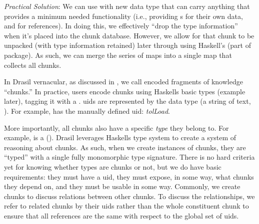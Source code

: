 \begin{writingdirectives}
      \item \textit{Practical Solution}: We can use \ExistentialQuantification{}
            with new data type that can carry anything that provides a minimum
            needed functionality (i.e., providing \UID{}s for their own data,
            and for references). In doing this, we effectively ``drop the type
            information'' when it's placed into the chunk database. However, we
            allow for that chunk to be unpacked (with type information retained)
            later through using Haskell's  (part of
             package). As such, we can merge the series of maps
            into a single map that collects all chunks.

\end{writingdirectives}

In Drasil vernacular, as discussed in , we call encoded
fragments of knowledge ``chunks.'' In practice, users encode chunks using
Haskells basic  types (example later), tagging it with a
. \acsp{uid} are represented by the \UID{} data type (a string of text,
). For example, 
has the manually defined \acs{uid}: \textit{tolLoad}.

More importantly, all chunks also have a specific \textit{type} they belong to.
For example,  is a \QuantityDict{}
(). Drasil leverages Haskells type system to
create a system of reasoning about chunks. As such, when we create instances of
chunks, they are ``typed'' with a single fully monomorphic type signature. There
is no hard criteria yet for knowing whether  types are chunks or
not, but we do have basic requirements: they must have a \acs{uid}, they must
expose, in some way, what chunks they depend on, and they must be usable in some
way. Commonly, we create chunks to discuss relations between other chunks. To
discuss the relationships, we refer to related chunks by their \acsp{uid} rather
than the whole constituent chunk to ensure that all references are the same with
respect to the global set of \acsp{uid}.

